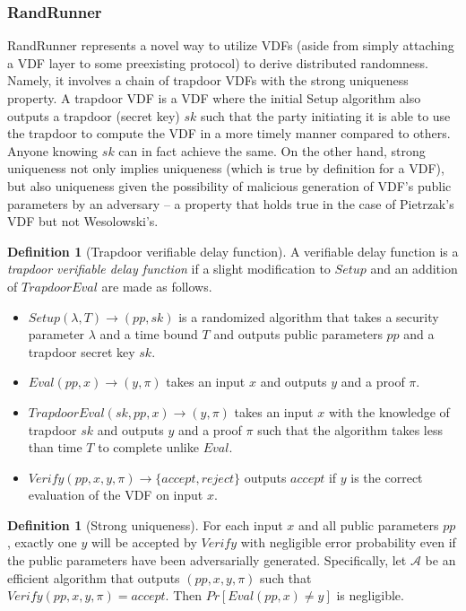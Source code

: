 \documentclass[letterpaper,twocolumn,10pt]{article}
\theoremstyle{definition}
\newtheorem{definition}[theorem]{Definition}
\theoremstyle{remark}
\begin{document}
\subsubsection{RandRunner}
RandRunner represents a novel way to utilize VDFs (aside from simply attaching a VDF layer to some preexisting protocol) to derive distributed randomness. Namely, it involves a chain of trapdoor VDFs with the strong uniqueness property. A trapdoor VDF is a VDF where the initial Setup algorithm also outputs a trapdoor (secret key) $sk$ such that the party initiating it is able to use the trapdoor to compute the VDF in a more timely manner compared to others. Anyone knowing $sk$ can in fact achieve the same. On the other hand, strong uniqueness not only implies uniqueness (which is true by definition for a VDF), but also uniqueness given the possibility of malicious generation of VDF's public parameters by an adversary -- a property that holds true in the case of Pietrzak's VDF but not Wesolowski's.

\begin{definition}[Trapdoor verifiable delay function]
A verifiable delay function is a \textit{trapdoor verifiable delay function} if a slight modification to $Setup$ and an addition of $TrapdoorEval$ are made as follows.
\begin{itemize}
\item $Setup(\lambda, T) \rightarrow (pp, sk)$ is a randomized algorithm that takes a security parameter $\lambda$ and a time bound $T$ and outputs public parameters $pp$ and a trapdoor secret key $sk$.
\item $Eval(pp, x) \rightarrow (y, \pi)$ takes an input $x$ and outputs $y$ and a proof $\pi$.
\item $TrapdoorEval(sk, pp, x) \rightarrow (y, \pi)$ takes an input $x$ with the knowledge of trapdoor $sk$ and outputs $y$ and a proof $\pi$ such that the algorithm takes less than time $T$ to complete unlike $Eval$.
\item $Verify(pp, x, y, \pi) \rightarrow \{accept, reject\}$ outputs $accept$ if $y$ is the correct evaluation of the VDF on input $x$.
\end{itemize}
\end{definition}

\begin{definition}[Strong uniqueness]
For each input $x$ and all public parameters $pp$, exactly one $y$ will be accepted by $Verify$ with negligible error probability even if the public parameters have been adversarially generated. Specifically, let $\mathcal{A}$ be an efficient algorithm that outputs $(pp, x, y, \pi)$ such that $Verify(pp, x, y, \pi) = accept$. Then $Pr[Eval(pp, x) \neq y]$ is negligible.
\end{definition}
\end{document}
